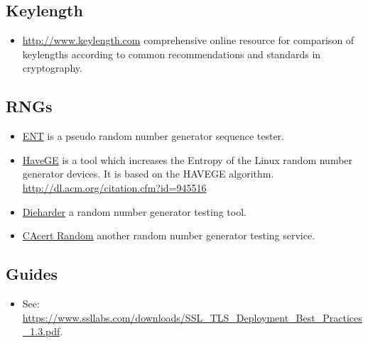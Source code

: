 \subsection{Keylength}
\begin{itemize}
\item \url{http://www.keylength.com} comprehensive online resource for comparison of keylengths according to common recommendations and standards in cryptography.
\end{itemize}


\subsection{RNGs}

\begin{itemize}
\item \href{http://www.fourmilab.ch/random/}{ENT} is a pseudo random number generator sequence tester.
\item \href{http://www.issihosts.com/haveged/}{HaveGE} is a tool which increases the Entropy of the Linux random number generator devices. It is based on the HAVEGE algorithm. \url{http://dl.acm.org/citation.cfm?id=945516}
\item \href{http://www.phy.duke.edu/~rgb/General/dieharder.php}{Dieharder} a random number generator testing tool.
\item \href{http://www.cacert.at/random/}{CAcert Random} another random number generator testing service.
\end{itemize}

\subsection{Guides}
\begin{itemize}
\item See: \url{https://www.ssllabs.com/downloads/SSL_TLS_Deployment_Best_Practices_1.3.pdf}.
\end{itemize}

